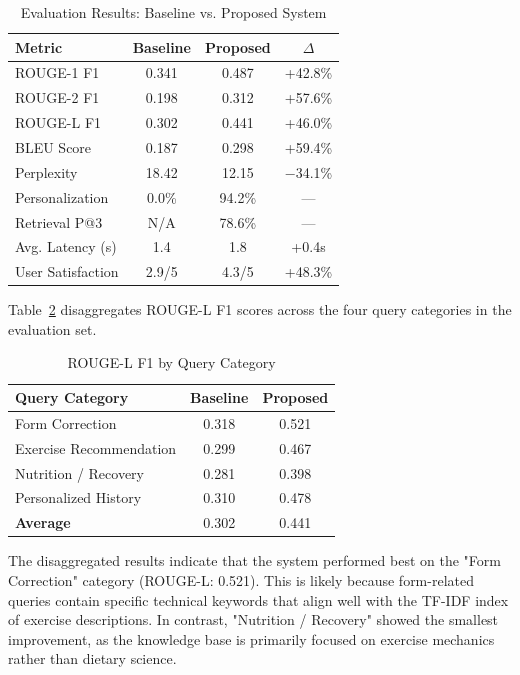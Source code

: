 \documentclass[conference]{IEEEtran}
\begin{document}
\begin{table}[htbp]
\caption{Evaluation Results: Baseline vs. Proposed System}
\label{tab:mainresults}
\centering
\begin{tabular}{lccc}
\toprule
\textbf{Metric} & \textbf{Baseline} & \textbf{Proposed} & \textbf{$\Delta$} \\
\midrule
ROUGE-1 F1       & 0.341 & 0.487 & +42.8\% \\
ROUGE-2 F1       & 0.198 & 0.312 & +57.6\% \\
ROUGE-L F1       & 0.302 & 0.441 & +46.0\% \\
BLEU Score       & 0.187 & 0.298 & +59.4\% \\
Perplexity       & 18.42 & 12.15 & $-$34.1\% \\
Personalization  & 0.0\% & 94.2\% & --- \\
Retrieval P@3    & N/A   & 78.6\% & --- \\
Avg. Latency (s) & 1.4   & 1.8   & +0.4s  \\
User Satisfaction & 2.9/5 & 4.3/5 & +48.3\% \\
\bottomrule
\end{tabular}
\end{table}

Table~\ref{tab:rougecategory} disaggregates ROUGE-L F1 scores across the four query categories in the evaluation set.

\begin{table}[htbp]
\caption{ROUGE-L F1 by Query Category}
\label{tab:rougecategory}
\centering
\begin{tabular}{lcc}
\toprule
\textbf{Query Category} & \textbf{Baseline} & \textbf{Proposed} \\
\midrule
Form Correction          & 0.318 & 0.521 \\
Exercise Recommendation  & 0.299 & 0.467 \\
Nutrition / Recovery     & 0.281 & 0.398 \\
Personalized History     & 0.310 & 0.478 \\
\midrule
\textbf{Average}         & 0.302 & 0.441 \\
\bottomrule
\end{tabular}
\end{table}

The disaggregated results indicate that the system performed best on the "Form Correction" category (ROUGE-L: 0.521). This is likely because form-related queries contain specific technical keywords that align well with the TF-IDF index of exercise descriptions. In contrast, "Nutrition / Recovery" showed the smallest improvement, as the knowledge base is primarily focused on exercise mechanics rather than dietary science.
\end{document}
